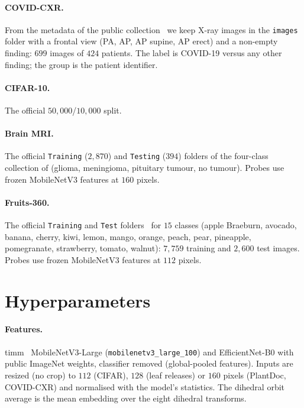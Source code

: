 \paragraph{COVID-CXR.} From the metadata of the public collection~\citep{cohen2020covid} we keep X-ray images in the \texttt{images} folder with a frontal view (PA, AP, AP supine, AP erect) and a non-empty finding: $699$ images of $424$ patients. The label is COVID-19 versus any other finding; the group is the patient identifier.

\paragraph{CIFAR-10.} The official $50{,}000$/$10{,}000$ split.

\paragraph{Brain MRI.} The official \texttt{Training} ($2{,}870$) and \texttt{Testing} ($394$) folders of the four-class collection of \citet{bhuvaji2020brain} (glioma, meningioma, pituitary tumour, no tumour). Probes use frozen MobileNetV3 features at $160$ pixels.

\paragraph{Fruits-360.} The official \texttt{Training} and \texttt{Test} folders~\citep{muresan2018fruits} for $15$ classes (apple Braeburn, avocado, banana, cherry, kiwi, lemon, mango, orange, peach, pear, pineapple, pomegranate, strawberry, tomato, walnut): $7{,}759$ training and $2{,}600$ test images. Probes use frozen MobileNetV3 features at $112$ pixels.

\section{Hyperparameters}
\label{app:hyper}

\paragraph{Features.} timm~\citep{wightman2019timm} MobileNetV3-Large (\texttt{mobilenetv3\_large\_100}) and EfficientNet-B0 with public ImageNet weights, classifier removed (global-pooled features). Inputs are resized (no crop) to $112$ (CIFAR), $128$ (leaf releases) or $160$ pixels (PlantDoc, COVID-CXR) and normalised with the model's statistics. The dihedral orbit average is the mean embedding over the eight dihedral transforms.


